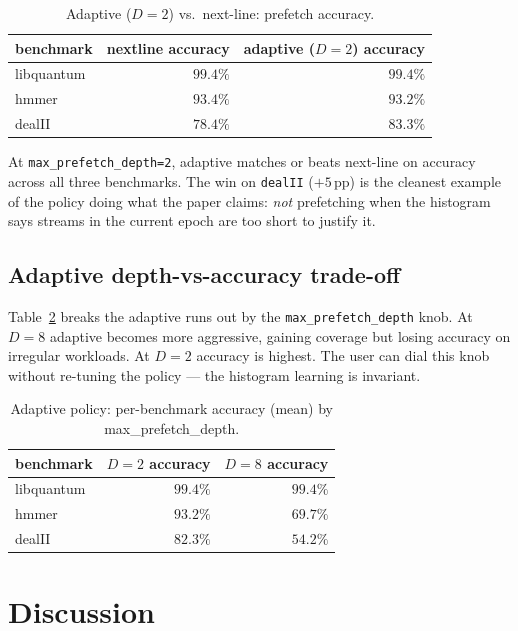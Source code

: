 \documentclass[11pt,letterpaper]{article}
\begin{document}
\begin{table}[H]
\centering
\caption{Adaptive ($D=2$) vs.\ next-line: prefetch accuracy.}
\label{tab:accuracy}
\begin{tabular}{lrr}
\toprule
benchmark   & nextline accuracy & adaptive ($D=2$) accuracy \\
\midrule
libquantum  & $99.4\%$ & $99.4\%$ \\
hmmer       & $93.4\%$ & $93.2\%$ \\
dealII      & $78.4\%$ & $\mathbf{83.3\%}$ \\
\bottomrule
\end{tabular}
\end{table}

At \texttt{max\_prefetch\_depth=2}, adaptive matches or beats next-line on
accuracy across all three benchmarks. The win on \texttt{dealII}
($+5\,\text{pp}$) is the cleanest example of the policy doing what
the paper claims: \emph{not} prefetching when the histogram says streams
in the current epoch are too short to justify it.

\subsection{Adaptive depth-vs-accuracy trade-off}
Table~\ref{tab:depth-tradeoff} breaks the adaptive runs out by the
\texttt{max\_prefetch\_depth} knob. At $D=8$ adaptive becomes more
aggressive, gaining coverage but losing accuracy on irregular workloads.
At $D=2$ accuracy is highest. The user can dial this knob without
re-tuning the policy --- the histogram learning is invariant.

\begin{table}[H]
\centering
\caption{Adaptive policy: per-benchmark accuracy (mean) by max\_prefetch\_depth.}
\label{tab:depth-tradeoff}
\begin{tabular}{lrr}
\toprule
benchmark   & $D=2$ accuracy & $D=8$ accuracy \\
\midrule
libquantum  & $99.4\%$ & $99.4\%$ \\
hmmer       & $93.2\%$ & $69.7\%$ \\
dealII      & $82.3\%$ & $54.2\%$ \\
\bottomrule
\end{tabular}
\end{table}

\section{Discussion}
\end{document}
